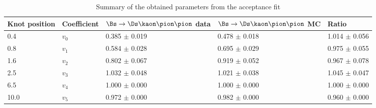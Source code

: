 \begin{table}[h]
\centering
\caption{Summary of the obtained parameters from the acceptance fit} 
\begin{tabular}{l l l l l}
\hline
\hline
Knot position & Coefficient & $\Bs\to\Ds\kaon\pion\pion$ data & $\Bs\to\Ds\kaon\pion\pion$ MC & Ratio \\
\hline
0.4 & $v_{0}$ & 0.385 $\pm$ 0.019 & 0.478 $\pm$ 0.018 & 1.014 $\pm$ 0.056\\
0.8 & $v_{1}$ & 0.584 $\pm$ 0.028 & 0.695 $\pm$ 0.029 & 0.975 $\pm$ 0.055\\
1.6 & $v_{2}$ & 0.802 $\pm$ 0.067 & 0.919 $\pm$ 0.052 & 0.967 $\pm$ 0.078\\
2.5 & $v_{3}$ & 1.032 $\pm$ 0.048 & 1.021 $\pm$ 0.038 & 1.045 $\pm$ 0.047\\
6.5 & $v_{4}$ & 1.000 $\pm$ 0.000 & 1.000 $\pm$ 0.000 & 1.000 $\pm$ 0.000\\
10.0 & $v_{5}$ & 0.972 $\pm$ 0.000 & 0.982 $\pm$ 0.000 & 0.960 $\pm$ 0.000\\
\hline
\hline
\end{tabular}
\label{table:splines}
\end{table}
